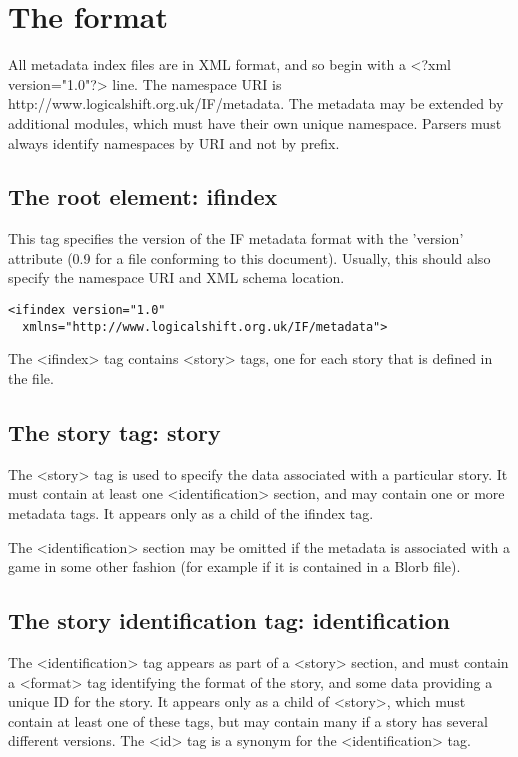 \documentclass[a4paper,11pt]{article}
\begin{document}
\section{The format}

All metadata index files are in XML format, and so begin with a <?xml version="1.0"?>
line. The namespace URI is http://www.logicalshift.org.uk/IF/metadata. The metadata may
be extended by additional modules, which must have their own unique namespace. Parsers
must always identify namespaces by URI and not by prefix.

\subsection{The root element: ifindex}

This tag specifies the version of the IF metadata format with the 'version' attribute (0.9 for a
file conforming to this document). Usually, this should also specify the namespace URI
and XML schema location.

\begin{example}
  \begin{verbatim}
<ifindex version="1.0"
  xmlns="http://www.logicalshift.org.uk/IF/metadata">
  \end{verbatim}
\end{example}

The <ifindex> tag contains <story> tags, one for each story that is defined in the file.

\subsection{The story tag: story}

The <story> tag is used to specify the data associated with a particular story. It must contain
at least one <identification> section, and may contain one or more metadata tags. It appears
only as a child of the ifindex tag.

The <identification> section may be omitted if the metadata is associated with a game in
some other fashion (for example if it is contained in a Blorb file).

\subsection{The story identification tag: identification}

The <identification> tag appears as part of a <story> section, and must contain a <format>
tag identifying the format of the story, and some data providing a unique ID for the story.
It appears only as a child of <story>, which must contain at least one of these tags, but
may contain many if a story has several different versions. The <id> tag is a synonym for
the <identification> tag.
\end{document}
